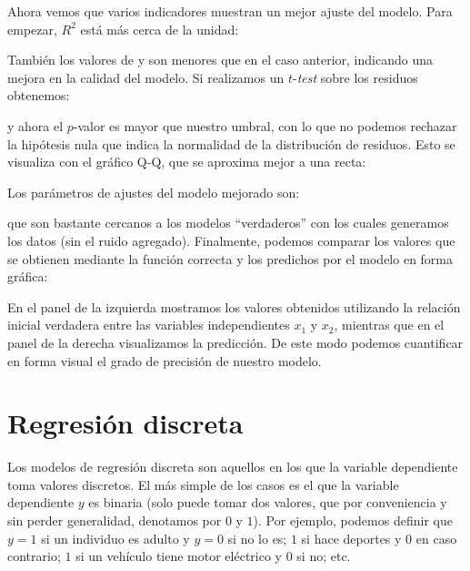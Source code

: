 Ahora vemos que varios indicadores muestran un mejor ajuste del modelo. Para empezar, $R^2$ está más cerca de la unidad:


También los valores de  y  son menores que en el caso anterior, indicando una mejora en la calidad del modelo. Si realizamos un $t$-\textit{test} sobre los residuos obtenemos:


\noindent y ahora el $p$-valor es mayor que nuestro umbral, con lo que no podemos rechazar la hipótesis nula que indica la normalidad de la distribución de residuos. Esto se visualiza con el gráfico Q-Q, que se aproxima mejor a una recta:


Los parámetros de ajustes del modelo mejorado son:


\noindent que son bastante cercanos a los modelos ``verdaderos'' con los cuales generamos los datos (sin el ruido agregado). Finalmente, podemos comparar los valores que se obtienen mediante la función correcta y los predichos por el modelo en forma gráfica:



En el panel de la izquierda mostramos los valores obtenidos utilizando la relación inicial verdadera entre las variables independientes $x_1$ y $x_2$, mientras que en el panel de la derecha visualizamos la predicción. De este modo podemos cuantificar en forma visual el grado de precisión de nuestro modelo.

\section{Regresión discreta}

Los modelos de regresión discreta son aquellos en los que la variable dependiente toma valores discretos. El más simple de los casos es el que la variable dependiente $y$ es binaria (solo puede tomar dos valores, que por conveniencia y sin perder generalidad, denotamos por $0$ y $1$). Por ejemplo, podemos definir que $y = 1$ si un individuo es adulto y $y = 0$ si no lo es; $1$ si hace deportes y $0$ en caso contrario; $1$ si un vehículo tiene motor eléctrico y $0$ si no; etc.


